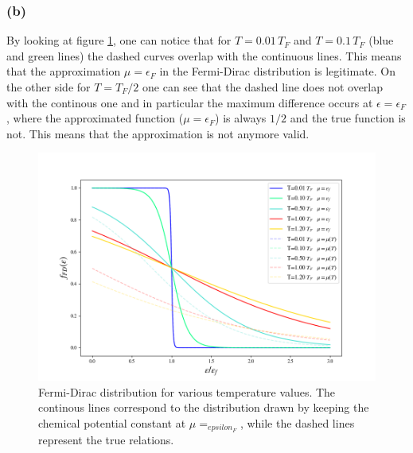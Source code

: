 \documentclass{article}
\begin{document}
\subsubsection*{(b)}
By looking at figure \ref{fig:fFD_mu}, one can notice that for $T=0.01 \, T_F$ and $T=0.1 \, T_F$ (blue and green lines) the dashed curves overlap with the continuous lines. This means that the approximation 
$\mu = \epsilon_F$ in the Fermi-Dirac distribution is legitimate. On the other side for $T=T_F/2$ one can see that the dashed line does not overlap with the continous one and in particular the maximum difference 
occurs at $\epsilon = \epsilon_F$, where the approximated function ($\mu = \epsilon_F$) is always $1/2$ and the true function is not. This means that the approximation is not anymore valid.
\begin{figure}[htp]
    \centering 
    \includegraphics[scale=0.5]{scripts/f_fd_mu.png}
    \caption{Fermi-Dirac distribution for various temperature values. The continous lines correspond to 
    the distribution drawn by keeping the chemical potential constant at $\mu=_{epsilon_F}$, while the dashed lines represent the true relations.}
    \label{fig:fFD_mu}
\end{figure}
\end{document}
